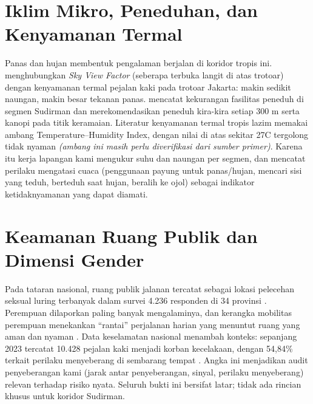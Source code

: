 \documentclass[11pt,a4paper]{report}
\begin{document}
\section{Iklim Mikro, Peneduhan, dan Kenyamanan Termal}
Panas dan hujan membentuk pengalaman berjalan di koridor tropis ini. \textcite{arif2021skyview}
menghubungkan \emph{Sky View Factor} (seberapa terbuka langit di atas trotoar) dengan kenyamanan
termal pejalan kaki pada trotoar Jakarta: makin sedikit naungan, makin besar tekanan panas.
\textcite{dwisadana2024} mencatat kekurangan fasilitas peneduh di segmen Sudirman dan
merekomendasikan peneduh kira-kira setiap 300 m serta kanopi pada titik keramaian. Literatur
kenyamanan termal tropis lazim memakai ambang Temperature--Humidity Index, dengan nilai di atas
sekitar 27\textdegree C tergolong tidak nyaman \emph{(ambang ini masih perlu diverifikasi dari
sumber primer)}. Karena itu kerja lapangan kami mengukur suhu dan naungan per segmen, dan mencatat
perilaku mengatasi cuaca (penggunaan payung untuk panas/hujan, mencari sisi yang teduh, berteduh
saat hujan, beralih ke ojol) sebagai indikator ketidaknyamanan yang dapat diamati.

\section{Keamanan Ruang Publik dan Dimensi Gender}
Pada tataran nasional, ruang publik jalanan tercatat sebagai lokasi pelecehan seksual luring
terbanyak dalam survei 4.236 responden di 34 provinsi \autocite{krpa2022}. %
Perempuan dilaporkan paling banyak mengalaminya, dan kerangka mobilitas perempuan menekankan
``rantai'' perjalanan harian yang menuntut ruang yang aman dan nyaman
\autocite{udk_mobilitasperempuan}. %
Data keselamatan nasional menambah konteks: sepanjang 2023 tercatat 10.428 pejalan kaki menjadi
korban kecelakaan, dengan 54,84\% terkait perilaku menyeberang di sembarang tempat
\autocite{korlantas2023}. Angka ini menjadikan audit penyeberangan kami (jarak antar
penyeberangan, sinyal, perilaku menyeberang) relevan terhadap risiko nyata.
Seluruh bukti ini bersifat latar; tidak ada rincian khusus untuk koridor Sudirman.
\end{document}
